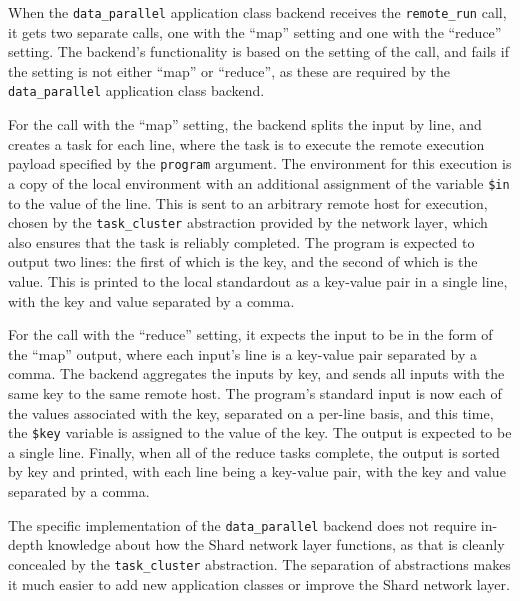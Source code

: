 \documentclass[oneside]{report}
\begin{document}
When the \texttt{data\_parallel} application class backend receives the \texttt{remote\_run} call, it gets two separate calls, one with the ``map'' setting and one with the ``reduce'' setting.
The backend's functionality is based on the setting of the call, and fails if the setting is not either ``map'' or ``reduce'', as these are required by the \texttt{data\_parallel} application class backend.

For the call with the ``map'' setting, the backend splits the input by line, and creates a task for each line, where the task is to execute the remote execution payload specified by the \texttt{program} argument.
The environment for this execution is a copy of the local environment with an additional assignment of the variable \texttt{\$in} to the value of the line.
This is sent to an arbitrary remote host for execution, chosen by the \texttt{task\_cluster} abstraction provided by the network layer, which also ensures that the task is reliably completed.
The program is expected to output two lines: the first of which is the key, and the second of which is the value.
This is printed to the local standardout as a key-value pair in a single line, with the key and value separated by a comma.

For the call with the ``reduce'' setting, it expects the input to be in the form of the ``map'' output, where each input's line is a key-value pair separated by a comma.
The backend aggregates the inputs by key, and sends all inputs with the same key to the same remote host.
The program's standard input is now each of the values associated with the key, separated on a per-line basis, and this time, the \texttt{\$key} variable is assigned to the value of the key.
The output is expected to be a single line.
Finally, when all of the reduce tasks complete, the output is sorted by key and printed, with each line being a key-value pair, with the key and value separated by a comma.

\begin{sloppypar}
  The specific implementation of the \texttt{data\_parallel} backend does not require in-depth knowledge about how the Shard network layer functions, as that is cleanly concealed by the \texttt{task\_cluster} abstraction.
  The separation of abstractions makes it much easier to add new application classes or improve the Shard network layer.
\end{sloppypar}
\end{document}
